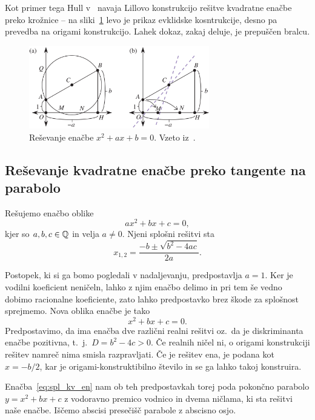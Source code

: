 Kot primer tega Hull v~\cite[str.\ 38]{hull2020} navaja Lillovo konstrukcijo rešitve kvadratne enačbe preko krožnice -- na sliki~\ref{fig:par_primer_hull_lill} levo je prikaz evklidske kosntrukcije, desno pa prevedba na origami konstrukcijo. Lahek dokaz, zakaj deluje, je prepuščen bralcu.

\begin{figure}[h]
    \centering
    \includegraphics[width=0.7\textwidth]{images/kvadratna_enacba/primer_hull_lill.png}
    \caption[Primer reševanja kvadratne enačbe z evklidskim orodjem]{Reševanje enačbe $x^2 + ax + b = 0$. Vzeto iz~\cite[str.\ 38]{hull2020}.}
    \label{fig:par_primer_hull_lill}
\end{figure}

\subsection{Reševanje kvadratne enačbe preko tangente na parabolo}
\label{podpogl:kvadratna_enacba}

Rešujemo enačbo oblike
$$ a x^2 + b x + c = 0, $$
kjer so $a, b, c \in \mathbb Q$ in velja $a \neq 0$.  Njeni splošni rešitvi sta
$$ x_{1,2} = \frac{-b \pm \sqrt{b^2 - 4ac}}{2a}.$$

Postopek, ki si ga bomo pogledali v nadaljevanju, predpostavlja $a = 1$. Ker je vodilni koeficient neničeln, lahko z njim enačbo delimo in pri tem še vedno dobimo racionalne koeficiente, zato lahko predpostavko brez škode za splošnost sprejmemo. Nova oblika enačbe je tako
\begin{equation}
    \label{eq:spl_kv_en}
    x^2 + bx + c = 0.
\end{equation}
Predpostavimo, da ima enačba dve različni realni rešitvi oz.\ da je diskriminanta enačbe pozitivna, t.\ j.\ $D = b^2 - 4c > 0$. Če realnih ničel ni, o origami konstrukciji rešitev namreč nima smisla razpravljati. Če je rešitev ena, je podana kot $x = -b/2$, kar je origami-konstruktibilno število in se ga lahko takoj konstruira.

Enačba~\ref{eq:spl_kv_en} nam ob teh predpostavkah torej poda pokončno parabolo $y = x^2 + bx + c$ z vodoravno premico vodnico in dvema ničlama, ki sta rešitvi naše enačbe. Iščemo abscisi presečišč parabole z abscisno osjo.

